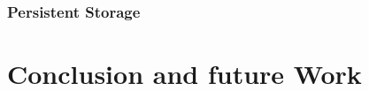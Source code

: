 \documentclass[11pt,a4paper]{scrreprt}
\begin{document}
	\subsection{Persistent Storage} %
	\label{sec:android_pers_storage}
	

\chapter{Conclusion and future Work} %
\label{chp:platform_choice}


%
%
\end{document}
